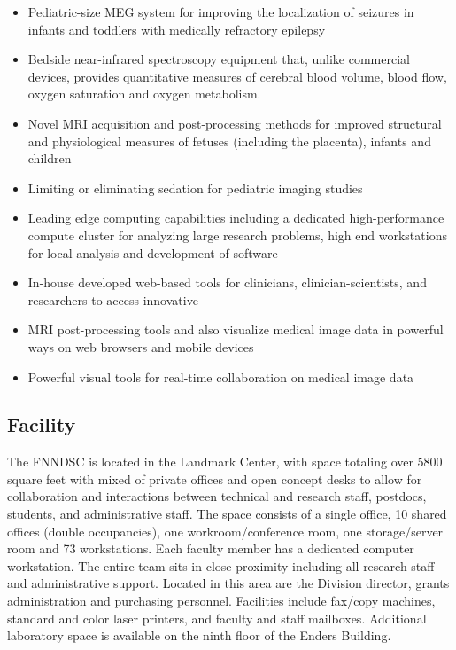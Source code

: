 \documentclass[11pt]{amsart}
\begin{document}
\begin{itemize}

\item Pediatric-size MEG system for improving the localization of seizures in infants and toddlers with medically refractory epilepsy

\item Bedside near-infrared spectroscopy equipment that, unlike commercial devices, provides quantitative measures of cerebral blood volume, blood flow, oxygen saturation and oxygen metabolism.

\item Novel MRI acquisition and post-processing methods for improved structural and physiological measures of fetuses (including the placenta), infants and children

\item Limiting or eliminating sedation for pediatric imaging studies

\item Leading edge computing capabilities including a dedicated high-performance compute cluster for analyzing large research problems, high end workstations for local analysis and development of software

\item In-house developed web-based tools for clinicians, clinician-scientists, and researchers to access innovative

\item MRI post-processing tools and also visualize medical image data in powerful ways on web browsers and mobile devices

\item Powerful visual tools for real-time collaboration on medical image data

\end{itemize}


\hypertarget{x-facility}{\subsection*{Facility}}
The FNNDSC is located in the Landmark Center, with space totaling over 5800 square feet with mixed of private offices and open concept desks to allow for collaboration and interactions between technical and research staff, postdocs, students, and administrative staff. The space consists of a single office, 10 shared offices (double occupancies), one workroom/conference room, one storage/server room and 73 workstations. Each faculty member has a dedicated computer workstation. The entire team sits in close proximity including all research staff and administrative support. Located in this area are the Division director, grants administration and purchasing personnel. Facilities include fax/copy machines, standard and color laser printers, and faculty and staff mailboxes. Additional laboratory space is available on the ninth floor of the Enders Building.
\end{document}
